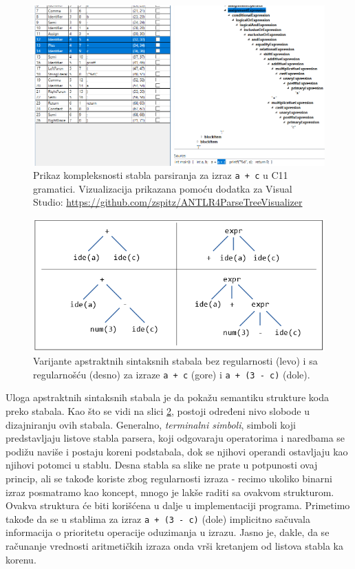\begin{figure}[h!]
    \centering
    \includegraphics[scale=0.45]{images/parse_tree_expr.png}
    \caption{Prikaz kompleksnosti stabla parsiranja za izraz 
    \texttt{a + c} u C11 gramatici. Vizualizacija prikazana pomoću 
    dodatka za Visual Studio: 
    \url{https://github.com/zspitz/ANTLR4ParseTreeVisualizer}} 
    \label{fig:CompilationProcessPars1}
\end{figure}

\begin{figure}[h!]
    \centering
    \includegraphics[scale=0.8]{images/ast.png}
    \caption{Varijante apstraktnih sintaksnih stabala bez regularnosti
    (levo) i sa regularnošću (desno) za izraze \texttt{a + c} (gore) i 
    \texttt{a + (3 - c)} (dole).} 
    \label{fig:ASTSimple}
\end{figure}

Uloga apstraktnih sintaksnih stabala je da pokažu semantiku strukture
koda preko stabala. Kao što se vidi na slici \ref{fig:ASTSimple}, 
postoji određeni nivo slobode u dizajniranju ovih stabala. Generalno,
\emph{terminalni simboli}, simboli koji predstavljaju listove stabla
parsera, koji odgovaraju operatorima i naredbama se podižu naviše i 
postaju koreni podstabala, dok se njihovi operandi ostavljaju kao 
njihovi potomci u stablu. Desna stabla sa slike ne prate u potpunosti
ovaj princip, ali se takođe koriste zbog regularnosti izraza - recimo
ukoliko binarni izraz posmatramo kao koncept, mnogo je lakše raditi
sa ovakvom strukturom. Ovakva struktura će biti korišćena u dalje u 
implementaciji programa. Primetimo takođe da se u stablima za izraz 
\texttt{a + (3 - c)} (dole) implicitno sačuvala informacija o 
prioritetu operacije oduzimanja u izrazu. Jasno je, dakle, da se 
računanje vrednosti aritmetičkih izraza onda vrši kretanjem od 
listova stabla ka korenu.

